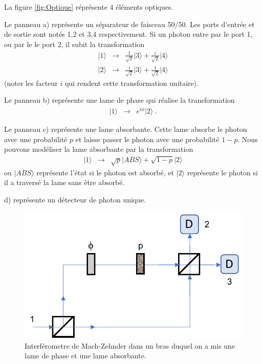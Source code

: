 \begin{enumerate}
La figure \ref{fig:Optique} réprésente 4 éléments optiques.

Le panneau a) représente un séparateur de faisceau 50/50. Les ports d'entrée et de sortie sont notés 1,2 et 3,4 respectivement. Si un photon entre par le port 1, ou par le le port 2, il subit la transformation
\begin{eqnarray}
\vert 1 \rangle &\to & \frac{1}{\sqrt{2}} \vert 3 \rangle + \frac{i}{\sqrt{2}} \vert 4 \rangle \\
\vert 2 \rangle &\to & \frac{i}{\sqrt{2}} \vert 3 \rangle + \frac{1}{\sqrt{2}} \vert 4 \rangle 
\end{eqnarray}
(noter les facteur $i$ qui rendent cette transformation unitaire).

Le panneau b) représente une lame de phase qui réalise la transformation
\begin{eqnarray}
\vert 1 \rangle &\to & e^{i \phi}  \vert 2 \rangle \ .
\label{Eq:opt3}
\end{eqnarray}

Le panneau c) représente une lame absorbante. Cette lame absorbe le photon avec une probabilité $p$ et laisse passer le photon avec une probabilité $1-p$. Nous pouvons modéliser la lame absorbante par la transformation
\begin{eqnarray}
\vert 1 \rangle &\to & \sqrt{p}  \vert ABS \rangle + \sqrt{1-p}  \vert 2 \rangle 
\end{eqnarray}
ou $\vert ABS \rangle$ représente l'état si le photon est absorbé, et $\vert 2 \rangle $ représente le photon si il a traversé la lame sans être absorbé.

d) représente un détecteur de photon unique.



\begin{figure}[h!]
\begin{center}
\includegraphics[width=0.5\columnwidth]{Pictures/Fig-Interf.pdf} 
\end{center}
\caption{Interférometre de Mach-Zehnder dans un bras duquel on a mis une lame de phase et une lame absorbante.}
\label{fig:MZ}
\end{figure}

\end{enumerate}


